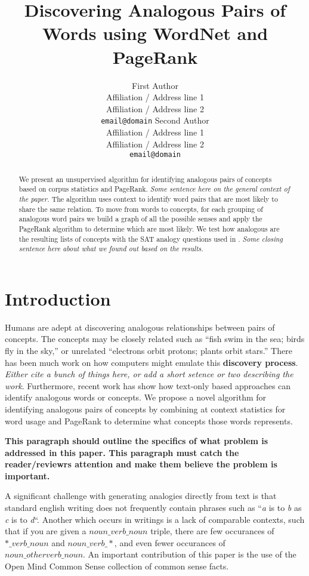 \documentclass[11pt]{article}
\title{Discovering Analogous Pairs of Words using WordNet and PageRank}
\author{First Author\\
  Affiliation / Address line 1\\
  Affiliation / Address line 2\\
  {\tt email@domain}  \And
  Second Author\\
  Affiliation / Address line 1\\
  Affiliation / Address line 2\\
  {\tt  email@domain}}
\date{}
\begin{document}
\maketitle

\begin{abstract}

We present an unsupervised algorithm for identifying analogous pairs of concepts
based on corpus statistics and PageRank.  \emph{Some sentence here on the
  general context of the paper.} The algorithm uses context to identify word
pairs that are most likely to share the same relation.  To move from words to
concepts, for each grouping of analogous word pairs we build a graph of all the
possible senses and apply the PageRank algorithm to determine which are most
likely.  We test how analogous are the resulting lists of concepts with the SAT
analogy questions used in \cite{turney03combining}.  \emph{Some closing sentence
  here about what we found out based on the results.}


\end{abstract}

\section{Introduction}

Humans are adept at discovering analogous relationships between pairs of
concepts.  The concepts may be closely related such as ``fish swim in the sea;
birds fly in the sky,'' or unrelated ``electrons orbit protons; plants orbit
stars.''  There has been much work on how computers might emulate this {\bf
  discovery process}\cite{gentner83structure}.  \emph{Either cite a bunch of
  things here, or add a short setence or two describing the work}.  Furthermore,
recent work has show how text-only based approaches can identify analogous words
or concepts\cite{mangalath04analogy,turney05corpus,bicici06clustering}.  We
propose a novel algorithm for identifying analogous pairs of concepts by
combining at context statistics for word usage and PageRank\cite{brin98anatomy}
to determine what concepts those words represents.

{\bf This paragraph should outline the specifics of what problem is addressed in
  this paper.  This paragraph must catch the reader/reviewrs attention and make
  them believe the problem is important.}

A significant challenge with generating analogies directly from text is that
standard english writing does not frequently contain phrases such as ``\emph{a}
is to \emph{b} as \emph{c} is to \emph{d}``.  Another which occurs in writings
is a lack of comparable contexts, such that if you are given a $noun\_verb\_noun$
triple, there are few occurances of $*\_verb\_noun$ and $noun\_verb\_*$, and
even fewer occurances of $noun\_otherverb\_noun$.  An important contribution of
this paper is the use of the Open Mind Common Sense \cite{havasi07conceptnet} 
collection of common sense facts.
\end{document}
